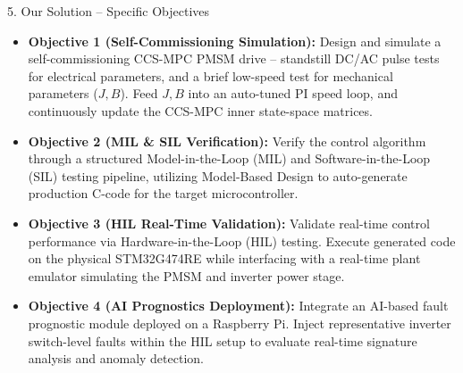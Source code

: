 \documentclass[aspectratio=169]{beamer}
\begin{document}
\begin{frame}{5. Our Solution -- Specific Objectives}
    \begin{itemize}
        \item \textbf{Objective 1 (Self-Commissioning Simulation):} Design and simulate a self-commissioning CCS-MPC PMSM drive -- standstill DC/AC pulse tests for electrical parameters, and a brief low-speed test for mechanical parameters ($J, B$). Feed $J, B$ into an auto-tuned PI speed loop, and continuously update the CCS-MPC inner state-space matrices.
        \item \textbf{Objective 2 (MIL \& SIL Verification):} Verify the control algorithm through a structured Model-in-the-Loop (MIL) and Software-in-the-Loop (SIL) testing pipeline, utilizing Model-Based Design to auto-generate production C-code for the target microcontroller.
        \item \textbf{Objective 3 (HIL Real-Time Validation):} Validate real-time control performance via Hardware-in-the-Loop (HIL) testing. Execute generated code on the physical STM32G474RE while interfacing with a real-time plant emulator simulating the PMSM and inverter power stage.
        \item \textbf{Objective 4 (AI Prognostics Deployment):} Integrate an AI-based fault prognostic module deployed on a Raspberry Pi. Inject representative inverter switch-level faults within the HIL setup to evaluate real-time signature analysis and anomaly detection.
    \end{itemize}
\end{frame}
\end{document}
